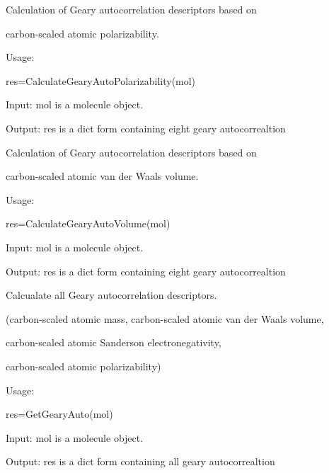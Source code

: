 \documentclass[letterpaper,10pt,english]{sphinxmanual}
\begin{document}

\begin{fulllineitems}
\label{reference/geary:geary.CalculateGearyAutoPolarizability}
Calculation of Geary autocorrelation descriptors based on

carbon-scaled atomic polarizability.

Usage:

res=CalculateGearyAutoPolarizability(mol)

Input: mol is a molecule object.

Output: res is a dict form containing eight geary autocorrealtion

\end{fulllineitems}


\begin{fulllineitems}
\label{reference/geary:geary.CalculateGearyAutoVolume}
Calculation of Geary autocorrelation descriptors based on

carbon-scaled atomic van der Waals volume.

Usage:

res=CalculateGearyAutoVolume(mol)

Input: mol is a molecule object.

Output: res is a dict form containing eight geary autocorrealtion

\end{fulllineitems}


\begin{fulllineitems}
\label{reference/geary:geary.GetGearyAuto}
Calcualate all Geary autocorrelation descriptors.

(carbon-scaled atomic mass, carbon-scaled atomic van der Waals volume,

carbon-scaled atomic Sanderson electronegativity,

carbon-scaled atomic polarizability)

Usage:

res=GetGearyAuto(mol)

Input: mol is a molecule object.

Output: res is a dict form containing all geary autocorrealtion

\end{fulllineitems}
\end{document}
